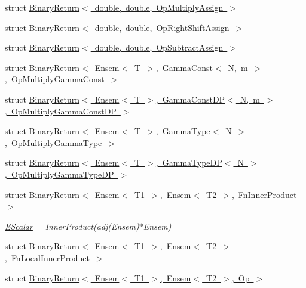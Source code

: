 \begin{DoxyCompactItemize}
\item 
struct \mbox{\hyperlink{structENSEM_1_1BinaryReturn_3_01double_00_01double_00_01OpMultiplyAssign_01_4}{Binary\+Return$<$ double, double, Op\+Multiply\+Assign $>$}}
\item 
struct \mbox{\hyperlink{structENSEM_1_1BinaryReturn_3_01double_00_01double_00_01OpRightShiftAssign_01_4}{Binary\+Return$<$ double, double, Op\+Right\+Shift\+Assign $>$}}
\item 
struct \mbox{\hyperlink{structENSEM_1_1BinaryReturn_3_01double_00_01double_00_01OpSubtractAssign_01_4}{Binary\+Return$<$ double, double, Op\+Subtract\+Assign $>$}}
\item 
struct \mbox{\hyperlink{structENSEM_1_1BinaryReturn_3_01Ensem_3_01T_01_4_00_01GammaConst_3_01N_00_01m_01_4_00_01OpMultiplyGammaConst_01_4}{Binary\+Return$<$ Ensem$<$ T $>$, Gamma\+Const$<$ N, m $>$, Op\+Multiply\+Gamma\+Const $>$}}
\item 
struct \mbox{\hyperlink{structENSEM_1_1BinaryReturn_3_01Ensem_3_01T_01_4_00_01GammaConstDP_3_01N_00_01m_01_4_00_01OpMultiplyGammaConstDP_01_4}{Binary\+Return$<$ Ensem$<$ T $>$, Gamma\+Const\+D\+P$<$ N, m $>$, Op\+Multiply\+Gamma\+Const\+D\+P $>$}}
\item 
struct \mbox{\hyperlink{structENSEM_1_1BinaryReturn_3_01Ensem_3_01T_01_4_00_01GammaType_3_01N_01_4_00_01OpMultiplyGammaType_01_4}{Binary\+Return$<$ Ensem$<$ T $>$, Gamma\+Type$<$ N $>$, Op\+Multiply\+Gamma\+Type $>$}}
\item 
struct \mbox{\hyperlink{structENSEM_1_1BinaryReturn_3_01Ensem_3_01T_01_4_00_01GammaTypeDP_3_01N_01_4_00_01OpMultiplyGammaTypeDP_01_4}{Binary\+Return$<$ Ensem$<$ T $>$, Gamma\+Type\+D\+P$<$ N $>$, Op\+Multiply\+Gamma\+Type\+D\+P $>$}}
\item 
struct \mbox{\hyperlink{structENSEM_1_1BinaryReturn_3_01Ensem_3_01T1_01_4_00_01Ensem_3_01T2_01_4_00_01FnInnerProduct_01_4}{Binary\+Return$<$ Ensem$<$ T1 $>$, Ensem$<$ T2 $>$, Fn\+Inner\+Product $>$}}
\begin{DoxyCompactList}\small\item\em \mbox{\hyperlink{classENSEM_1_1EScalar}{E\+Scalar}} = Inner\+Product(adj(\+Ensem)$\ast$\+Ensem) \end{DoxyCompactList}\item 
struct \mbox{\hyperlink{structENSEM_1_1BinaryReturn_3_01Ensem_3_01T1_01_4_00_01Ensem_3_01T2_01_4_00_01FnLocalInnerProduct_01_4}{Binary\+Return$<$ Ensem$<$ T1 $>$, Ensem$<$ T2 $>$, Fn\+Local\+Inner\+Product $>$}}
\item 
struct \mbox{\hyperlink{structENSEM_1_1BinaryReturn_3_01Ensem_3_01T1_01_4_00_01Ensem_3_01T2_01_4_00_01Op_01_4}{Binary\+Return$<$ Ensem$<$ T1 $>$, Ensem$<$ T2 $>$, Op $>$}}

\end{DoxyCompactItemize}
